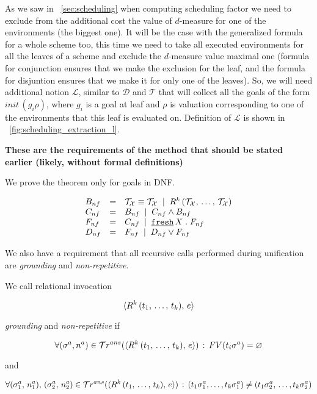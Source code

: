 As we saw in \sectionword~\ref{sec:scheduling} when computing scheduling factor we need to exclude from the additional cost the value of $d$-measure for one of the environments (the biggest one). It will be the case with the generalized formula for a whole scheme too, this time we need to take all executed environments for all the leaves of a scheme and exclude the $d$-measure value maximal one (formula for conjunction ensures that we make the exclusion for the leaf, and the formula for disjuntion ensures that we make it for only one of the leaves). So, we will need additional notion $\mathcal{L}$, similar to $\mathcal{D}$ and $\mathcal{T}$ that will collect all the goals of the form $init\,(g_i \rho)$, where $g_i$ is a goal at leaf and $\rho$ is valuation corresponding to one of the environments that this leaf is evaluated on. Definition of $\mathcal{L}$ is shown in \figureword~\ref{fig:scheduling_extraction_l}.


\FloatBarrier








\colorbox{red!20}{\parbox{\textwidth}{\textbf{These are the requirements of the method that should be stated earlier (likely, without formal definitions)}}}

We prove the theorem only for goals in DNF.

\[
\begin{array}{lcl}
B_{nf} & = &  \mathcal{T}_\mathcal{X} \equiv \mathcal{T}_\mathcal{X} \; \mid \;
                     R^k\,(\mathcal{T}_\mathcal{X}, \, \dots, \, \mathcal{T}_\mathcal{X}) \\
C_{nf} & = & B_{nf} \; \mid \; C_{nf} \land B_{nf} \\
F_{nf} & = & C_{nf} \; \mid \; \texttt{\underline {fresh}} \, X\;.\; F_{nf} \\
D_{nf} & = & F_{nf} \; \mid \; D_{nf} \lor F_{nf}
\end{array}
\]

We also have a requirement that all recursive calls performed during unification are \emph{grounding} and \emph{non-repetitive}.

\begin{definition}
  We call relational invocation
  
  \[\langle R^k\,(t_1, \, \dots, \, t_k) ,\, e \rangle\]

  \emph{grounding} and \emph{non-repetitive} if 

  \[ \forall (\sigma^{a}, n^{a}) \in \mathcal{T}r^{ans}(\langle R^k\,(t_1, \, \dots, \, t_k) ,\, e \rangle) \,:\, FV(t_i \sigma^{a}) = \varnothing \]

  and
  
  \[ \forall (\sigma_1^{a},\, n_1^{a}),\, (\sigma_2^{a},\, n_2^{a}) \in \mathcal{T}r^{ans}(\langle R^k\,(t_1, \, \dots, \, t_k) ,\, e \rangle) \,:\, (t_1 \sigma_1^{a}, \dots, t_k \sigma_1^{a}) \ne (t_1 \sigma_2^{a},\, \dots, t_k \sigma_2^{a}) \]
\end{definition}


